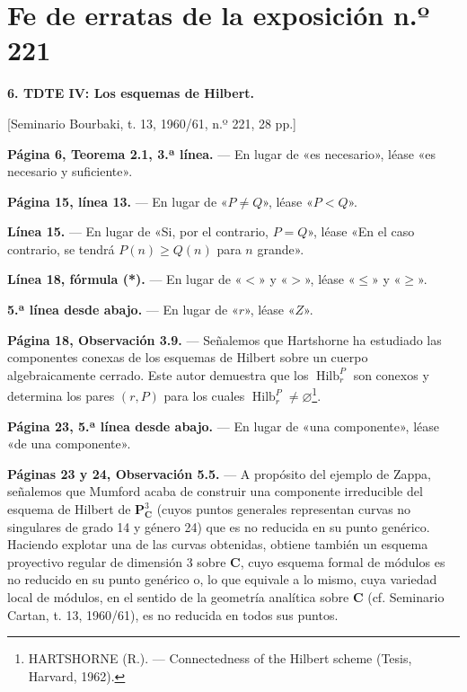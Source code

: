 \clearpage
\chapter*{Fe de erratas de la exposición n.º 221}
\setcounter{footnote}{3}

\noindent\textbf{6. TDTE IV: Los esquemas de Hilbert.}

\begin{center}
[Seminario Bourbaki, t. 13, 1960/61, n.º 221, 28 pp.]
\end{center}

\noindent\textbf{Página 6, Teorema 2.1, 3.ª línea.} --- En lugar de
«es necesario», léase «es necesario y suficiente».

\noindent\textbf{Página 15, línea 13.} --- En lugar de «$P\neq Q$», léase
«$P<Q$».

\noindent\textbf{Línea 15.} --- En lugar de «Si, por el contrario, $P=Q$»,
léase «En el caso contrario, se tendrá $P(n)\geq Q(n)$ para $n$ grande».

\noindent\textbf{Línea 18, fórmula (*).} --- En lugar de «$<$» y «$>$»,
léase «$\leq$» y «$\geq$».

\noindent\textbf{5.ª línea desde abajo.} --- En lugar de «$r$», léase «$Z$».

\noindent\textbf{Página 18, Observación 3.9.} --- Señalemos que Hartshorne ha
estudiado las componentes conexas de los esquemas de Hilbert sobre un cuerpo
algebraicamente cerrado. Este autor demuestra que los
$\operatorname{Hilb}^{P}_{r}$ son conexos y determina los pares $(r,P)$ para
los cuales $\operatorname{Hilb}^{P}_{r}\neq\varnothing$\footnote{HARTSHORNE
(R.). --- Connectedness of the Hilbert scheme (Tesis, Harvard, 1962).}.

\noindent\textbf{Página 23, 5.ª línea desde abajo.} --- En lugar de «una
componente», léase «de una componente».

\noindent\textbf{Páginas 23 y 24, Observación 5.5.} --- A propósito del ejemplo
de Zappa, señalemos que Mumford acaba de construir una componente irreducible
del esquema de Hilbert de $\mathbf P^3_{\mathbf C}$ (cuyos puntos generales
representan curvas no singulares de grado 14 y género 24) que es no reducida
en su punto genérico. Haciendo explotar una de las curvas obtenidas, obtiene
también un esquema proyectivo regular de dimensión 3 sobre $\mathbf C$, cuyo
esquema formal de módulos es no reducido en su punto genérico o, lo que
equivale a lo mismo, cuya variedad local de módulos, en el sentido de la
geometría analítica sobre $\mathbf C$ (cf. Seminario Cartan, t. 13, 1960/61),
es no reducida en todos sus puntos.
